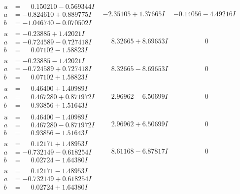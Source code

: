 \documentclass[1p]{elsarticle_modified}
\theoremstyle{definition}
\begin{document}
$$\begin{array}{c|c|c}
\begin{aligned}
u &= \phantom{-}0.150210 - 0.569344 I \\
a &= -0.824610 + 0.889775 I \\
b &= -1.046740 - 0.070502 I\end{aligned}
 & -2.35105 + 1.37665 I & -0.14056 - 4.49216 I \\ \hline\begin{aligned}
u &= -0.23885 + 1.42021 I \\
a &= -0.724589 - 0.727418 I \\
b &= \phantom{-}0.07102 - 1.58823 I\end{aligned}
 & \phantom{-}8.32665 + 8.69653 I & \phantom{-0.000000 } 0 \\ \hline\begin{aligned}
u &= -0.23885 - 1.42021 I \\
a &= -0.724589 + 0.727418 I \\
b &= \phantom{-}0.07102 + 1.58823 I\end{aligned}
 & \phantom{-}8.32665 - 8.69653 I & \phantom{-0.000000 } 0 \\ \hline\begin{aligned}
u &= \phantom{-}0.46400 + 1.40989 I \\
a &= \phantom{-}0.467280 + 0.871972 I \\
b &= \phantom{-}0.93856 + 1.51643 I\end{aligned}
 & \phantom{-}2.96962 - 6.50699 I & \phantom{-0.000000 } 0 \\ \hline\begin{aligned}
u &= \phantom{-}0.46400 - 1.40989 I \\
a &= \phantom{-}0.467280 - 0.871972 I \\
b &= \phantom{-}0.93856 - 1.51643 I\end{aligned}
 & \phantom{-}2.96962 + 6.50699 I & \phantom{-0.000000 } 0 \\ \hline\begin{aligned}
u &= \phantom{-}0.12171 + 1.48953 I \\
a &= -0.732149 - 0.618254 I \\
b &= \phantom{-}0.02724 - 1.64380 I\end{aligned}
 & \phantom{-}8.61168 - 6.87817 I & \phantom{-0.000000 } 0 \\ \hline\begin{aligned}
u &= \phantom{-}0.12171 - 1.48953 I \\
a &= -0.732149 + 0.618254 I \\
b &= \phantom{-}0.02724 + 1.64380 I\end{aligned}

\end{array}$$
\end{document}
